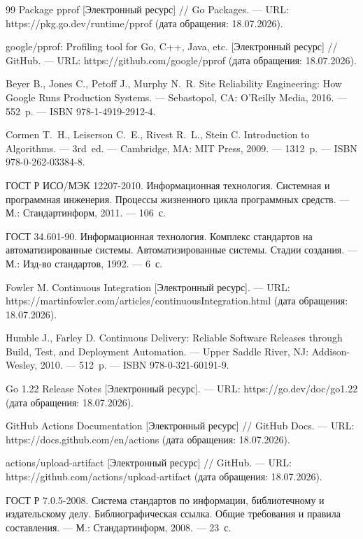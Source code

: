 \documentclass[12pt,a4paper]{article}
\numberwithin{equation}{section}
\begin{document}
\begin{thebibliography}{99}
Package pprof [Электронный ресурс] // Go Packages. --- URL: https://pkg.go.dev/runtime/pprof (дата обращения: 18.07.2026).

google/pprof: Profiling tool for Go, C++, Java, etc. [Электронный ресурс] // GitHub. --- URL: https://github.com/google/pprof (дата обращения: 18.07.2026).

Beyer B., Jones C., Petoff J., Murphy N.~R. Site Reliability Engineering: How Google Runs Production Systems. --- Sebastopol, CA: O'Reilly Media, 2016. --- 552~p. --- ISBN 978-1-4919-2912-4.

Cormen T.~H., Leiserson C.~E., Rivest R.~L., Stein C. Introduction to Algorithms. --- 3rd~ed. --- Cambridge, MA: MIT Press, 2009. --- 1312~p. --- ISBN 978-0-262-03384-8.

ГОСТ Р ИСО/МЭК 12207-2010. Информационная технология. Системная и программная инженерия. Процессы жизненного цикла программных средств. --- М.: Стандартинформ, 2011. --- 106~с.

ГОСТ 34.601-90. Информационная технология. Комплекс стандартов на автоматизированные системы. Автоматизированные системы. Стадии создания. --- М.: Изд-во стандартов, 1992. --- 6~с.

Fowler M. Continuous Integration [Электронный ресурс]. --- URL: https://martinfowler.com/articles/continuousIntegration.html (дата обращения: 18.07.2026).

Humble J., Farley D. Continuous Delivery: Reliable Software Releases through Build, Test, and Deployment Automation. --- Upper Saddle River, NJ: Addison-Wesley, 2010. --- 512~p. --- ISBN 978-0-321-60191-9.

Go 1.22 Release Notes [Электронный ресурс]. --- URL: https://go.dev/doc/go1.22 (дата обращения: 18.07.2026).

GitHub Actions Documentation [Электронный ресурс] // GitHub Docs. --- URL: https://docs.github.com/en/actions (дата обращения: 18.07.2026).

actions/upload-artifact [Электронный ресурс] // GitHub. --- URL: https://github.com/actions/upload-artifact (дата обращения: 18.07.2026).

ГОСТ Р 7.0.5-2008. Система стандартов по информации, библиотечному и издательскому делу. Библиографическая ссылка. Общие требования и правила составления. --- М.: Стандартинформ, 2008. --- 23~с.

\end{thebibliography}
\end{document}
